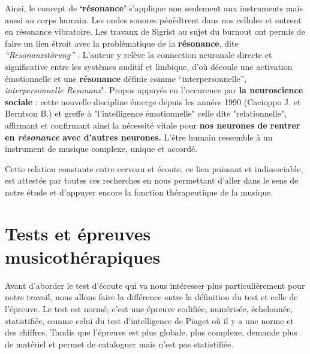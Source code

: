 Ainsi, le concept de \textbf{`résonance'} s'applique non seulement aux instruments mais aussi au corps humain. Les ondes sonores pénèdtrent dans nos cellules et entrent en résonance vibratoire.
Les travaux de Sigrist au sujet du burnout ont permis de faire un lien étroit avec la problématique de la
 \textbf{résonance}, dite \textit{``Resonanzstörung''} \autocite[pp.55--90] {sigrist_burnout_2016}.
L'auteur y relève la connection neuronale
directe et significative entre les systèmes auditif et
         limbique, d'où découle une activation émotionnelle et une
         \textbf{résonance} définie comme
         ``interpersonnelle'', \textit{interpersonnelle
             Resonanz}".
Propos appuyés en l'occurence par \textbf{la neuroscience sociale} \autocite[201]{van_eersel_cerveau}:  cette nouvelle discipline émerge depuis
les années 1990 (Cacioppo J. et Berntson B.) et greffe à "l'intelligence
émotionnelle" celle dite "relationnelle", affirmant et confirmant ainsi la nécessité vitale pour
 \textbf{nos neurones  de rentrer en \textit{résonance} avec d'autres neurones.}
L'être humain ressemble à un instrument de musique complexe, unique et accordé.

 Cette relation constante entre cerveau et écoute,
ce lien puissant et indissociable, est attestée par toutes ces recherches en nous permettant d'aller dans
 le sens de notre étude et d'appuyer encore
 la fonction thérapeutique de la musique.










\chapter{Tests et épreuves musicothérapiques}
Avant d'aborder le test d'écoute qui va nous intéresser plus
particulièrement pour notre travail, nous allons faire la différence
entre la définition du test et celle de l'épreuve.
Le test est normé, c'est une épreuve codifiée, numérisée, échelonnée,
statistifiée, comme celui du test d'intelligence de Piaget où il y a une
norme et des chiffres. Tandis que l'épreuve est plus globale, plus complexe,
demande plus de matériel et permet de
cataloguer mais n'est pas statistifiée.

